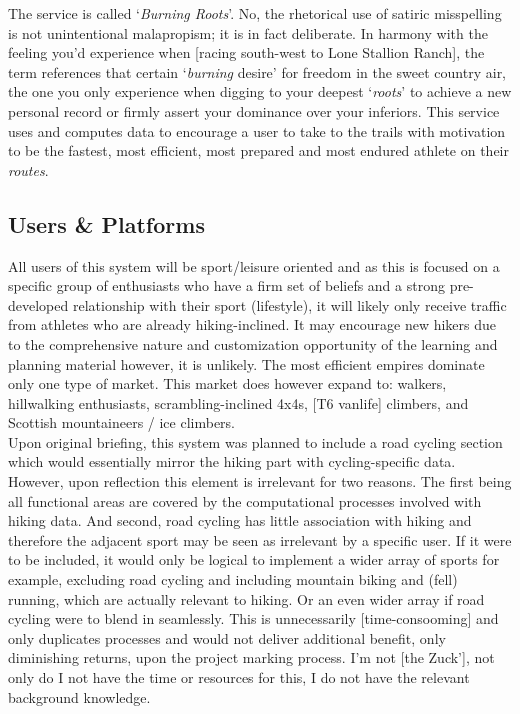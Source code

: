 \documentclass[11pt, english]{article}
\begin{document}
	The service is called `\textit{Burning Roots}'. No, the rhetorical use of satiric misspelling is not unintentional malapropism; it is in fact deliberate. In harmony with the feeling you'd experience when [racing south-west to Lone Stallion Ranch], the term references that certain `\textit{burning} desire' for freedom in the sweet country air, the one you only experience when digging to your deepest `\textit{roots}' to achieve a new personal record or firmly assert your dominance over your inferiors. This service uses and computes data to encourage a user to take to the trails with motivation to be the fastest, most efficient, most prepared and most endured athlete on their \textit{routes}.

	\subsection{Users \& Platforms}

	All users of this system will be sport/leisure oriented and as this is focused on a specific group of enthusiasts who have a firm set of beliefs and a strong pre-developed relationship with their sport (lifestyle), it will likely only receive traffic from athletes who are already hiking-inclined. It may encourage new hikers due to the comprehensive nature and customization opportunity of the learning and planning material however, it is unlikely. The most efficient empires dominate only one type of market. This market does however expand to: walkers, hillwalking enthusiasts, scrambling-inclined 4x4s, [T6 vanlife] climbers, and Scottish mountaineers / ice climbers.\\

	Upon original briefing, this system was planned to include a road cycling section which would essentially mirror the hiking part with cycling-specific data. However, upon reflection this element is irrelevant for two reasons. The first being all functional areas are covered by the computational processes involved with hiking data. And second, road cycling has little association with hiking and therefore the adjacent sport may be seen as irrelevant by a specific user. If it were to be included, it would only be logical to implement a wider array of sports for example, excluding road cycling and including mountain biking and (fell) running, which are actually relevant to hiking. Or an even wider array if road cycling were to blend in seamlessly. This is unnecessarily [time-consooming] and only duplicates processes and would not deliver additional benefit, only diminishing returns, upon the project marking process. I'm not [the Zuck'], not only do I not have the time or resources for this, I do not have the relevant background knowledge.\\
\end{document}
